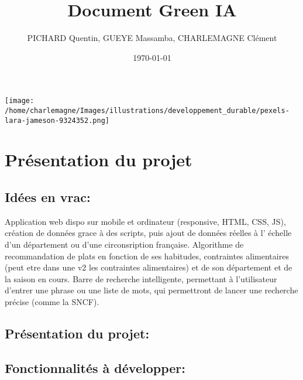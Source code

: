 \documentclass[11pt]{article}
\title{Document Green IA}
\author{PICHARD Quentin, GUEYE Massamba, CHARLEMAGNE Clément}
\date{\today}
\begin{document}
\maketitle

\begin{center}
    \texttt{[image: /home/charlemagne/Images/illustrations/developpement\_durable/pexels-lara-jameson-9324352.png]}
\end{center}

\section{\textcolor{section}{Présentation du projet\\}}
\subsection*{\textcolor{sub_section}{Idées en vrac:}}
Application web dispo sur mobile et ordinateur (responsive, HTML, CSS, JS),
création de données grace à des scripts, puis ajout de données réelles à l'
échelle d'un département ou d'une circonsription française. Algorithme de recommandation 
de plats en fonction de ses habitudes, contraintes alimentaires (peut etre dans une v2 les 
contraintes alimentaires) et de son département et de la saison en cours. Barre de recherche 
intelligente, permettant à l'utilisateur d'entrer une phrase ou une liste de mots, qui 
permettront de lancer une recherche précise (comme la SNCF). 

\subsection*{\textcolor{sub_section}{Présentation du projet:}}

\subsection*{\textcolor{sub_section}{Fonctionnalités à développer:}}
\end{document}
